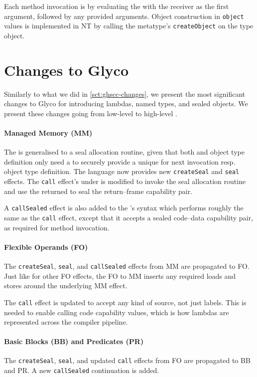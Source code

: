 \documentclass[main.tex]{subfiles}
\begin{document}
Each method invocation is \lowered{} by evaluating the  with the receiver as the first argument, followed by any provided arguments. Object construction in \texttt{object} values is implemented in NT by calling the metatype's \texttt{createObject}  on the type object.

\section{Changes to Glyco} \label{sct:obj-changes}
Similarly to what we did in \cref{sct:ghscc-changes}, we present the most significant changes to Glyco for introducing lambdas, named types, and sealed objects. We present these changes going from low-level to high-level .

\paragraph{Managed Memory (MM)} The   is generalised to a seal allocation routine, given that both  and object type definition only need a  to securely provide a unique  for next invocation resp. object type definition. The language now provides new \texttt{createSeal} and \texttt{seal} effects. The \texttt{call} effect's  under  is modified to invoke the seal allocation routine and use the returned  to seal the return–frame capability pair.

A \texttt{callSealed} effect is also added to the 's syntax which performs roughly the same as the \texttt{call} effect, except that it accepts a sealed code–data capability pair, as required for method invocation.

\paragraph{Flexible Operands (FO)} The \texttt{createSeal}, \texttt{seal}, and \texttt{callSealed} effects from MM are propagated to FO. Just like for other FO effects, the FO to MM  inserts any required loads and stores around the underlying MM effect.

The \texttt{call} effect is updated to accept any kind of source, not just labels. This is needed to enable calling code capability values, which is how lambdas are represented across the compiler pipeline.

\paragraph{Basic Blocks (BB) and Predicates (PR)} The \texttt{createSeal}, \texttt{seal}, and updated \texttt{call} effects from FO are propagated to BB and PR. A new \texttt{callSealed} continuation is added.
\end{document}
